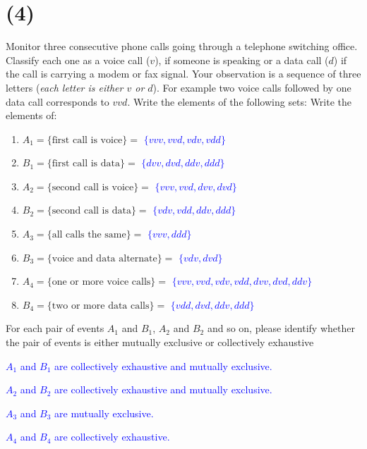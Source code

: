 \documentclass[12pt]{article}
\begin{document}
\newpage

\section*{(4)}
Monitor three consecutive phone calls going through a telephone switching
office. Classify each one as a voice call ($v$), if someone is speaking or a data call ($d$)
if the call is carrying a modem or fax signal. Your observation is a sequence of three
letters (\textit{each letter is either $v$ or $d$}). For example two voice calls followed by one data
call corresponds to $vvd$. Write the elements of the following sets:
Write the elements of:

\begin{enumerate}
    \item[a.] $A_1 = \{\text{first call is voice}\}=$ \textcolor{blue}{$\{vvv, vvd, vdv, vdd\}$}  
    \item[b.] $B_1 = \{\text{first call is data}\}=$  \textcolor{blue}{$\{dvv, dvd, ddv, ddd\}$}
    \item[c.] $A_2 = \{\text{second call is voice}\}=$  \textcolor{blue}{$\{vvv, vvd, dvv, dvd\}$}
    \item[d.] $B_2 = \{\text{second call is data}\}=$ \textcolor{blue}{$\{vdv, vdd, ddv, ddd\}$}
    \item[e.] $A_3 = \{\text{all calls the same}\}=$  \textcolor{blue}{$\{vvv, ddd\}$}
    \item[f.] $B_3 = \{\text{voice and data alternate}\}=$ \textcolor{blue}{$\{vdv, dvd\}$}
    \item[g.] $A_4 = \{\text{one or more voice calls}\}=$ \textcolor{blue}{$\{vvv, vvd, vdv, vdd, dvv, dvd, ddv\}$}
    \item[h.] $B_4 = \{\text{two or more data calls}\}=$ \textcolor{blue}{$\{vdd, dvd, ddv, ddd\}$} 
\end{enumerate}
For each pair of events $A_1$ and $B_1$, $A_2$ and $B_2$ and so on, please identify whether the
pair of events is either mutually exclusive or collectively exhaustive

\textcolor{blue}{$A_1$ and $B_1$ are collectively exhaustive and mutually exclusive.} 

\textcolor{blue}{$A_2$ and $B_2$ are collectively exhaustive and mutually exclusive.}

\textcolor{blue}{$A_3$ and $B_3$ are mutually exclusive.}

\textcolor{blue}{$A_4$ and $B_4$ are collectively exhaustive.}
\newpage 
\end{document}
